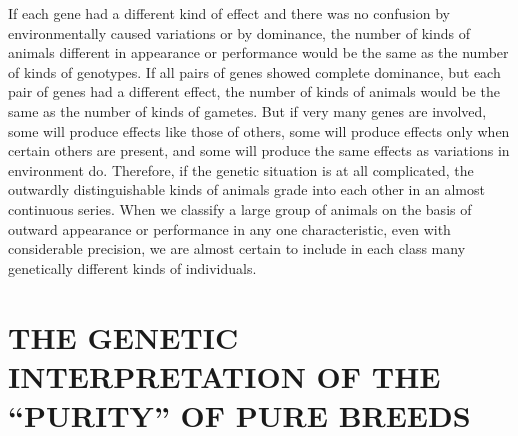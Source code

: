 If each gene had a different kind of effect and there was no confusion
by environmentally caused variations or by dominance, the number
of kinds of animals different in appearance or performance would
be the same as the number of kinds of genotypes. If all pairs of genes
showed complete dominance, but each pair of genes had a different
effect, the number of kinds of animals would be the same as the number
of kinds of gametes. But if very many genes are involved, some will
produce effects like those of others, some will produce effects only when
certain others are present, and some will produce the same effects as
variations in environment do. Therefore, if the genetic situation is at
all complicated, the outwardly distinguishable kinds of animals grade
into each other in an almost continuous series. When we classify a large
group of animals on the basis of outward appearance or performance
in any one characteristic, even with considerable precision, we are
almost certain to include in each class many genetically different kinds
of individuals.

\section*{THE GENETIC INTERPRETATION OF THE ``PURITY'' OF PURE BREEDS}

